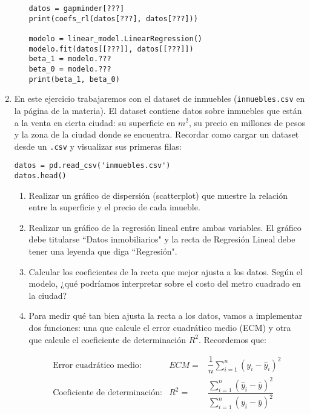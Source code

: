 \documentclass[a4paper,11pt]{article}
\theoremstyle{definition}
\begin{document}
\begin{enumerate}[resume]
\begin{enumerate}
\begin{lstlisting}
datos = gapminder[???]
print(coefs_rl(datos[???], datos[???]))

modelo = linear_model.LinearRegression()
modelo.fit(datos[[???]], datos[[???]])
beta_1 = modelo.???
beta_0 = modelo.???
print(beta_1, beta_0)
\end{lstlisting}
\end{enumerate}

\item En este ejercicio trabajaremos con el dataset de inmuebles (\texttt{inmuebles.csv} en la página de la materia). El dataset contiene datos sobre inmuebles que están a la venta en cierta ciudad: su superficie en $m^2$, su precio en millones de pesos y la zona de la ciudad donde se encuentra. Recordar como cargar un dataset desde un \texttt{.csv} y visualizar sus primeras filas:
\vspace{0.2cm}
\begin{lstlisting}
datos = pd.read_csv('inmuebles.csv')
datos.head()
\end{lstlisting}

\begin{enumerate}
    \item Realizar un gráfico de dispersión (scatterplot) que muestre la relación entre la superficie y el precio de cada imueble.
    
    \item Realizar un gráfico de la regresión lineal entre ambas variables. El gráfico debe titularse ``Datos inmobiliarios" y la recta de Regresión Lineal debe tener una leyenda que diga ``Regresión".
    
    \item Calcular los coeficientes de la recta que mejor ajusta a los datos. Según el modelo, ¿qué podríamos interpretar sobre el costo del metro cuadrado en la ciudad?
    
    \item Para medir qué tan bien ajusta la recta a los datos, vamos a implementar dos funciones: una que calcule el error cuadrático medio (ECM) y otra que calcule el coeficiente de determinación $R^2$. Recordemos que:

    \[
    \begin{array}{rrl}
        \text{Error cuadrático medio:} & ECM =& \dfrac{1}{n}\displaystyle \sum_{i=1}^n (y_i - \hat{y}_i)^2 \\[2em]
         \text{Coeficiente de determinación:}& R^2 =& \dfrac{\displaystyle\sum_{i=1}^n (\hat{y}_i - \bar{y})^2}{\displaystyle\sum_{i=1}^n (y_i - \bar{y})^2} 
    \end{array}
    \]


\end{enumerate}
\end{enumerate}
\end{document}
